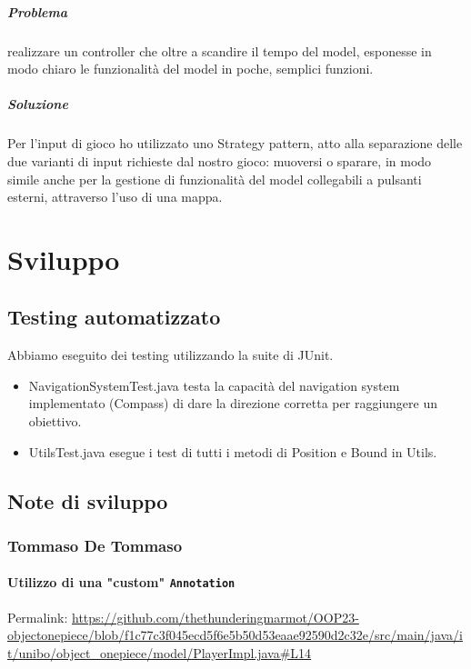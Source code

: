 \documentclass[a4paper,12pt]{report}
\begin{document}
\paragraph{Problema} realizzare un controller che oltre a scandire il tempo del model, esponesse in modo chiaro le funzionalità del model in poche, semplici funzioni.
\paragraph{Soluzione} Per l'input di gioco ho utilizzato uno Strategy pattern, atto alla separazione delle due varianti di input richieste dal nostro gioco: muoversi o sparare, in modo simile anche per la gestione di funzionalità del model collegabili a pulsanti esterni, attraverso l'uso di una mappa.

\chapter{Sviluppo}
\section{Testing automatizzato}

Abbiamo eseguito dei testing utilizzando la suite di JUnit.
%
\begin{itemize}
	\item NavigationSystemTest.java testa la capacità del navigation system implementato (Compass) di dare la direzione corretta per raggiungere un obiettivo.
	\item UtilsTest.java esegue i test di tutti i metodi di Position e Bound in Utils.
\end{itemize}

\section{Note di sviluppo}

\subsection*{Tommaso De Tommaso}
\subsubsection{Utilizzo di una "custom" \texttt{Annotation} }
Permalink: \url{https://github.com/thethunderingmarmot/OOP23-objectonepiece/blob/f1c77c3f045ecd5f6e5b50d53eaae92590d2c32e/src/main/java/it/unibo/object_onepiece/model/PlayerImpl.java#L14}
\end{document}
